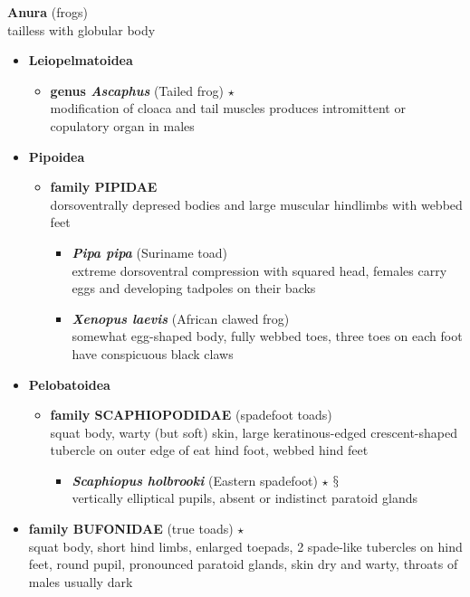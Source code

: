 \documentclass[a4paper,12pt]{article}
\begin{document}
\begin{description}
\item\textbf{Anura} (frogs) \\ tailless with globular body
\begin{itemize}
  \item{\textbf{Leiopelmatoidea}}
  \begin{itemize}
    \item{\textbf{genus\textit{   Ascaphus}} (Tailed frog) $\star$} \\ modification of cloaca and tail muscles produces intromittent or copulatory organ in males
  \end{itemize}
  \item{\textbf{Pipoidea}}
  \begin{itemize}
    \item{\textbf{family PIPIDAE}} \\ dorsoventrally depresed bodies and large muscular hindlimbs with webbed feet
    \begin{itemize}
      \item{\textbf{\textit{   Pipa pipa}} (Suriname toad)} \\ extreme dorsoventral compression with squared head, females carry eggs and developing tadpoles on their backs
      \item{\textbf{\textit{   Xenopus laevis}} (African clawed frog)} \\ somewhat egg-shaped body, fully webbed toes, three toes on each foot have conspicuous black claws
    \end{itemize}
  \end{itemize}
  \item{\textbf{Pelobatoidea}}
  \begin{itemize}
    \item{\textbf{family SCAPHIOPODIDAE} (spadefoot toads)} \\ squat body, warty (but soft) skin, large keratinous-edged crescent-shaped tubercle on outer edge of eat hind foot, webbed hind feet
    \begin{itemize}
      \item{\textbf{\textit{   Scaphiopus holbrooki}} (Eastern spadefoot) $\star$ $\mathsection$} \\ vertically elliptical pupils, absent or indistinct paratoid glands
    \end{itemize}
  \end{itemize}
  \item{\textbf{family BUFONIDAE} (true toads) $\star$} \\ squat body, short hind limbs, enlarged toepads, 2 spade-like tubercles on hind feet, round pupil, pronounced paratoid glands, skin dry and warty, throats of males usually dark

\end{itemize}
\end{description}
\end{document}

